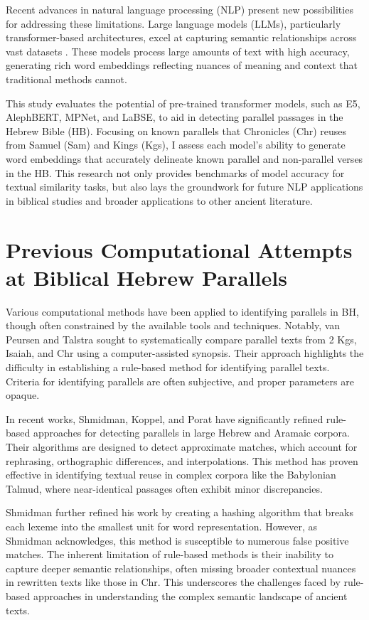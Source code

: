 \documentclass[12pt]{article}
\begin{document}
Recent advances in natural language processing (NLP) present new possibilities for addressing these limitations. Large language models (LLMs), particularly transformer-based architectures, excel at capturing semantic relationships across vast datasets \cite{Devlin}. These models process large amounts of text with high accuracy, generating rich word embeddings reflecting nuances of meaning and context that traditional methods cannot.

This study evaluates the potential of pre-trained transformer models, such as E5, AlephBERT, MPNet, and LaBSE, to aid in detecting parallel passages in the Hebrew Bible (HB). Focusing on known parallels that Chronicles (Chr) reuses from Samuel (Sam) and Kings (Kgs), I assess each model's ability to generate word embeddings that accurately delineate known parallel and non-parallel verses in the HB. This research not only provides benchmarks of model accuracy for textual similarity tasks, but also lays the groundwork for future NLP applications in biblical studies and broader applications to other ancient literature.

\section{Previous Computational Attempts at Biblical Hebrew Parallels}
Various computational methods have been applied to identifying parallels in BH, though often constrained by the available tools and techniques. Notably, van Peursen and Talstra \cite{vanPeursen} sought to systematically compare parallel texts from 2 Kgs, Isaiah, and Chr using a computer-assisted synopsis. Their approach highlights the difficulty in establishing a rule-based method for identifying parallel texts. Criteria for identifying parallels are often subjective, and proper parameters are opaque.

In recent works, Shmidman, Koppel, and Porat \cite{Shmidman} have significantly refined rule-based approaches for detecting parallels in large Hebrew and Aramaic corpora. Their algorithms are designed to detect approximate matches, which account for rephrasing, orthographic differences, and interpolations. This method has proven effective in identifying textual reuse in complex corpora like the Babylonian Talmud, where near-identical passages often exhibit minor discrepancies.

Shmidman \cite{Shmidman2022} further refined his work by creating a hashing algorithm that breaks each lexeme into the smallest unit for word representation. However, as Shmidman acknowledges, this method is susceptible to numerous false positive matches. The inherent limitation of rule-based methods is their inability to capture deeper semantic relationships, often missing broader contextual nuances in rewritten texts like those in Chr. This underscores the challenges faced by rule-based approaches in understanding the complex semantic landscape of ancient texts.
\end{document}
